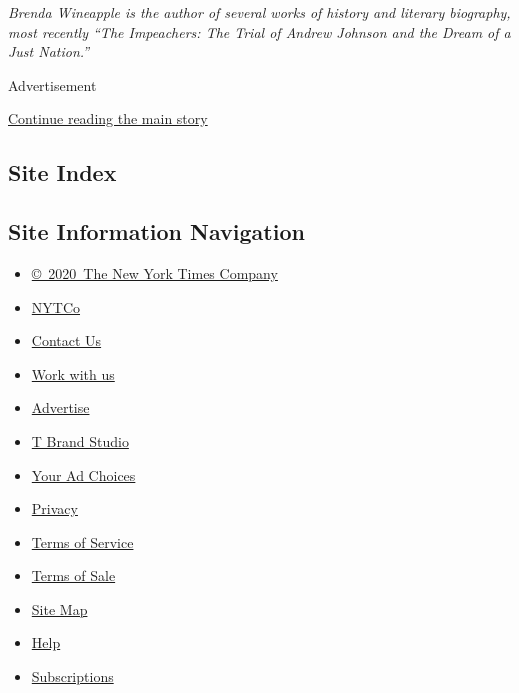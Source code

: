 \emph{Brenda Wineapple is the author of several works of history and
literary biography, most recently ``The Impeachers: The Trial of Andrew
Johnson and the Dream of a Just Nation.''}

Advertisement

\protect\hyperlink{after-bottom}{Continue reading the main story}

\hypertarget{site-index}{%
\subsection{Site Index}\label{site-index}}

\hypertarget{site-information-navigation}{%
\subsection{Site Information
Navigation}\label{site-information-navigation}}

\begin{itemize}
\tightlist
\item
  \href{https://help.nytimes3xbfgragh.onion/hc/en-us/articles/115014792127-Copyright-notice}{©~2020~The
  New York Times Company}
\end{itemize}

\begin{itemize}
\tightlist
\item
  \href{https://www.nytco.com/}{NYTCo}
\item
  \href{https://help.nytimes3xbfgragh.onion/hc/en-us/articles/115015385887-Contact-Us}{Contact
  Us}
\item
  \href{https://www.nytco.com/careers/}{Work with us}
\item
  \href{https://nytmediakit.com/}{Advertise}
\item
  \href{http://www.tbrandstudio.com/}{T Brand Studio}
\item
  \href{https://www.nytimes3xbfgragh.onion/privacy/cookie-policy\#how-do-i-manage-trackers}{Your
  Ad Choices}
\item
  \href{https://www.nytimes3xbfgragh.onion/privacy}{Privacy}
\item
  \href{https://help.nytimes3xbfgragh.onion/hc/en-us/articles/115014893428-Terms-of-service}{Terms
  of Service}
\item
  \href{https://help.nytimes3xbfgragh.onion/hc/en-us/articles/115014893968-Terms-of-sale}{Terms
  of Sale}
\item
  \href{https://spiderbites.nytimes3xbfgragh.onion}{Site Map}
\item
  \href{https://help.nytimes3xbfgragh.onion/hc/en-us}{Help}
\item
  \href{https://www.nytimes3xbfgragh.onion/subscription?campaignId=37WXW}{Subscriptions}
\end{itemize}
